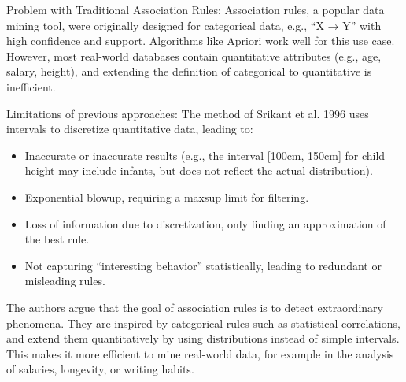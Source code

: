 \documentclass[12pt,letterpaper, onecolumn]{exam}
\begin{document}
\begin{questions}
\begin{solution}
        Problem with Traditional Association Rules: Association rules, a popular data mining tool, were originally designed for categorical data, e.g., “X → Y” with high confidence and support. Algorithms like Apriori work well for this use case. However, most real-world databases contain quantitative attributes (e.g., age, salary, height), and extending the definition of categorical to quantitative is inefficient.
      
        Limitations of previous approaches: The method of Srikant et al. 1996 \cite{srikant1996} uses intervals to discretize quantitative data, leading to:
        \begin{itemize}
            \item Inaccurate or inaccurate results (e.g., the interval [100cm, 150cm] for child height may include infants, but does not reflect the actual distribution).
            \item Exponential blowup, requiring a maxsup limit for filtering.
            \item Loss of information due to discretization, only finding an approximation of the best rule.
            \item Not capturing “interesting behavior” statistically, leading to redundant or misleading rules.
        \end{itemize}

        The authors argue that the goal of association rules is to detect extraordinary phenomena. They are inspired by categorical rules such as statistical correlations, and extend them quantitatively by using distributions instead of simple intervals. This makes it more efficient to mine real-world data, for example in the analysis of salaries, longevity, or writing habits.
        

\end{solution}
\end{questions}
\end{document}
